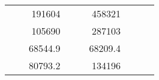 \begin{table}[H]
\begin{tabular}{|ccrccrccc}
\multicolumn{1}{|c|}{\cellcolor[HTML]{FFFFC7}}                                & \multicolumn{1}{c|}{\cellcolor[HTML]{DDFDFF}}                      & \multicolumn{1}{r|}{\cellcolor[HTML]{DAE8FC}191604}    & \multicolumn{1}{c|}{\cellcolor[HTML]{FFFFC7}}                                & \multicolumn{1}{c|}{\cellcolor[HTML]{DDFDFF}}                       & \multicolumn{1}{r|}{\cellcolor[HTML]{DDFDFF}458321}    &                                                                              &                                                                    &                                                        \\ \cline{3-3} \cline{6-6}
\multicolumn{1}{|c|}{\cellcolor[HTML]{FFFFC7}}                                & \multicolumn{1}{c|}{\cellcolor[HTML]{DDFDFF}}                      & \multicolumn{1}{r|}{\cellcolor[HTML]{DDFDFF}105690}    & \multicolumn{1}{c|}{\cellcolor[HTML]{FFFFC7}}                                & \multicolumn{1}{c|}{\cellcolor[HTML]{DDFDFF}}                       & \multicolumn{1}{r|}{\cellcolor[HTML]{DAE8FC}287103}    &                                                                              &                                                                    &                                                        \\ \cline{3-3} \cline{6-6}
\multicolumn{1}{|c|}{\cellcolor[HTML]{FFFFC7}}                                & \multicolumn{1}{c|}{\cellcolor[HTML]{DDFDFF}}                      & \multicolumn{1}{r|}{\cellcolor[HTML]{DAE8FC}68544.9}   & \multicolumn{1}{c|}{\cellcolor[HTML]{FFFFC7}}                                & \multicolumn{1}{c|}{\cellcolor[HTML]{DDFDFF}}                       & \multicolumn{1}{r|}{\cellcolor[HTML]{DDFDFF}68209.4}   &                                                                              &                                                                    &                                                        \\ \cline{3-3} \cline{6-6}
\multicolumn{1}{|c|}{\cellcolor[HTML]{FFFFC7}}                                & \multicolumn{1}{c|}{\cellcolor[HTML]{DDFDFF}}                      & \multicolumn{1}{r|}{\cellcolor[HTML]{DDFDFF}80793.2}   & \multicolumn{1}{c|}{\cellcolor[HTML]{FFFFC7}}                                & \multicolumn{1}{c|}{\cellcolor[HTML]{DDFDFF}}                       & \multicolumn{1}{r|}{\cellcolor[HTML]{DAE8FC}134196}    &                                                                              &                                                                    &                                                        \\ \cline{3-3} \cline{6-6}

\end{tabular}
\end{table}

